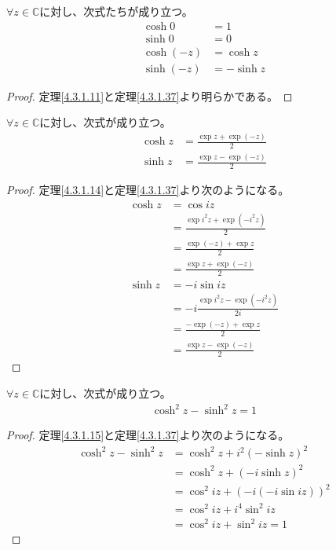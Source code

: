 \documentclass[dvipdfmx]{jsarticle}
\begin{document}
\begin{thm}\label{4.3.1.38} $\forall z \in \mathbb{C}$に対し、次式たちが成り立つ。
\begin{align*}
  \cosh 0 &= 1\\
  \sinh 0 &= 0\\
  \cosh( - z) &= \cosh z\\
  \sinh( - z) &= - \sinh z
\end{align*}
\end{thm}
\begin{proof} 定理\ref{4.3.1.11}と定理\ref{4.3.1.37}より明らかである。
\end{proof}
\begin{thm}\label{4.3.1.39} $\forall z \in \mathbb{C}$に対し、次式が成り立つ。
\begin{align*}
\cosh z &= \frac{\exp z + \exp( - z)}{2}\\
\sinh z &= \frac{\exp z - \exp( - z)}{2}
\end{align*}
\end{thm}
\begin{proof} 定理\ref{4.3.1.14}と定理\ref{4.3.1.37}より次のようになる。
\begin{align*}
\cosh z &= \cos{iz}\\
&= \frac{\exp{i^{2}z} + \exp\left( - i^{2}z \right)}{2}\\
&= \frac{\exp( - z) + \exp z}{2}\\
&= \frac{\exp z + \exp( - z)}{2}\\
\sinh z &= - i\sin{iz}\\
&= - i\frac{\exp{i^{2}z} - \exp\left( - i^{2}z \right)}{2i}\\
&= \frac{- \exp( - z) + \exp z}{2}\\
&= \frac{\exp z - \exp( - z)}{2}
\end{align*}
\end{proof}
\begin{thm}\label{4.3.1.40} $\forall z \in \mathbb{C}$に対し、次式が成り立つ。
\begin{align*}
\cosh^{2}z - \sinh^{2}z = 1
\end{align*}
\end{thm}
\begin{proof} 定理\ref{4.3.1.15}と定理\ref{4.3.1.37}より次のようになる。
\begin{align*}
\cosh^{2}z - \sinh^{2}z &= \cosh^{2}z + i^{2}\left( - \sinh z \right)^{2}\\
&= \cosh^{2}z + \left( - i\sinh z \right)^{2}\\
&= \cos^{2}{iz} + \left( - i\left( - i\sin{iz} \right) \right)^{2}\\
&= \cos^{2}{iz} + i^{4}\sin^{2}{iz}\\
&= \cos^{2}{iz} + \sin^{2}{iz} = 1
\end{align*}
\end{proof}
\end{document}
